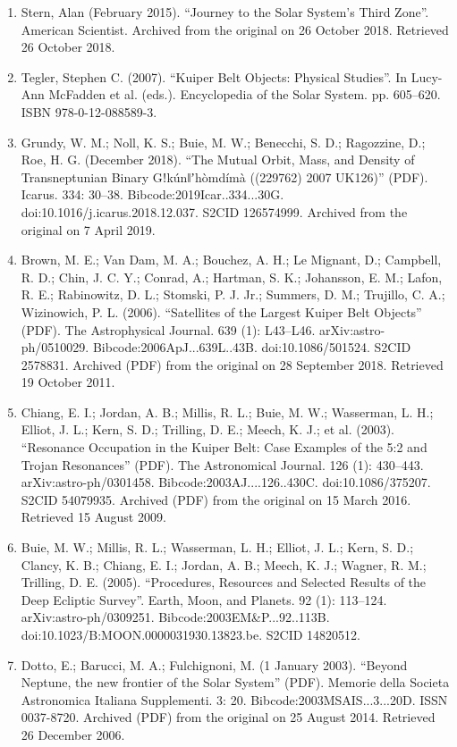 \begin{enumerate}
\item Stern, Alan (February 2015). ``Journey to the Solar System's Third Zone''. American Scientist. Archived from the original on 26 October 2018. Retrieved 26 October 2018.
\item Tegler, Stephen C. (2007). ``Kuiper Belt Objects: Physical Studies''. In Lucy-Ann McFadden et al. (eds.). Encyclopedia of the Solar System. pp. 605–620. ISBN 978-0-12-088589-3.
\item Grundy, W. M.; Noll, K. S.; Buie, M. W.; Benecchi, S. D.; Ragozzine, D.; Roe, H. G. (December 2018). ``The Mutual Orbit, Mass, and Density of Transneptunian Binary Gǃkúnǁʼhòmdímà ((229762) 2007 UK126)'' (PDF). Icarus. 334: 30–38. Bibcode:2019Icar..334...30G. doi:10.1016/j.icarus.2018.12.037. S2CID 126574999. Archived from the original on 7 April 2019.
\item Brown, M. E.; Van Dam, M. A.; Bouchez, A. H.; Le Mignant, D.; Campbell, R. D.; Chin, J. C. Y.; Conrad, A.; Hartman, S. K.; Johansson, E. M.; Lafon, R. E.; Rabinowitz, D. L.; Stomski, P. J. Jr.; Summers, D. M.; Trujillo, C. A.; Wizinowich, P. L. (2006). ``Satellites of the Largest Kuiper Belt Objects'' (PDF). The Astrophysical Journal. 639 (1): L43–L46. arXiv:astro-ph/0510029. Bibcode:2006ApJ...639L..43B. doi:10.1086/501524. S2CID 2578831. Archived (PDF) from the original on 28 September 2018. Retrieved 19 October 2011.
\item Chiang, E. I.; Jordan, A. B.; Millis, R. L.; Buie, M. W.; Wasserman, L. H.; Elliot, J. L.; Kern, S. D.; Trilling, D. E.; Meech, K. J.; et al. (2003). ``Resonance Occupation in the Kuiper Belt: Case Examples of the 5:2 and Trojan Resonances'' (PDF). The Astronomical Journal. 126 (1): 430–443. arXiv:astro-ph/0301458. Bibcode:2003AJ....126..430C. doi:10.1086/375207. S2CID 54079935. Archived (PDF) from the original on 15 March 2016. Retrieved 15 August 2009.
\item Buie, M. W.; Millis, R. L.; Wasserman, L. H.; Elliot, J. L.; Kern, S. D.; Clancy, K. B.; Chiang, E. I.; Jordan, A. B.; Meech, K. J.; Wagner, R. M.; Trilling, D. E. (2005). ``Procedures, Resources and Selected Results of the Deep Ecliptic Survey''. Earth, Moon, and Planets. 92 (1): 113–124. arXiv:astro-ph/0309251. Bibcode:2003EM\&P...92..113B. doi:10.1023/B:MOON.0000031930.13823.be. S2CID 14820512.
\item Dotto, E.; Barucci, M. A.; Fulchignoni, M. (1 January 2003). ``Beyond Neptune, the new frontier of the Solar System'' (PDF). Memorie della Societa Astronomica Italiana Supplementi. 3: 20. Bibcode:2003MSAIS...3...20D. ISSN 0037-8720. Archived (PDF) from the original on 25 August 2014. Retrieved 26 December 2006.

\end{enumerate}
